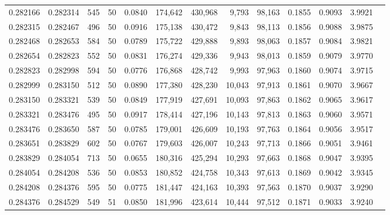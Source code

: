 \begin{tabular}{rrrrrrrrrrrrr}
0.282166 & 0.282314 &   545 &  50 &                                     0.0840 & 174,642 & 430,968 &   9,793 &  98,163 & 0.1855 & 0.9093 & 3.9921 \\
0.282315 & 0.282467 &   496 &  50 &                                     0.0916 & 175,138 & 430,472 &   9,843 &  98,113 & 0.1856 & 0.9088 & 3.9875 \\
0.282468 & 0.282653 &   584 &  50 &                                     0.0789 & 175,722 & 429,888 &   9,893 &  98,063 & 0.1857 & 0.9084 & 3.9821 \\
0.282654 & 0.282823 &   552 &  50 &                                     0.0831 & 176,274 & 429,336 &   9,943 &  98,013 & 0.1859 & 0.9079 & 3.9770 \\
0.282823 & 0.282998 &   594 &  50 &                                     0.0776 & 176,868 & 428,742 &   9,993 &  97,963 & 0.1860 & 0.9074 & 3.9715 \\
0.282999 & 0.283150 &   512 &  50 &                                     0.0890 & 177,380 & 428,230 &  10,043 &  97,913 & 0.1861 & 0.9070 & 3.9667 \\
0.283150 & 0.283321 &   539 &  50 &                                     0.0849 & 177,919 & 427,691 &  10,093 &  97,863 & 0.1862 & 0.9065 & 3.9617 \\
0.283321 & 0.283476 &   495 &  50 &                                     0.0917 & 178,414 & 427,196 &  10,143 &  97,813 & 0.1863 & 0.9060 & 3.9571 \\
0.283476 & 0.283650 &   587 &  50 &                                     0.0785 & 179,001 & 426,609 &  10,193 &  97,763 & 0.1864 & 0.9056 & 3.9517 \\
0.283651 & 0.283829 &   602 &  50 &                                     0.0767 & 179,603 & 426,007 &  10,243 &  97,713 & 0.1866 & 0.9051 & 3.9461 \\
0.283829 & 0.284054 &   713 &  50 &                                     0.0655 & 180,316 & 425,294 &  10,293 &  97,663 & 0.1868 & 0.9047 & 3.9395 \\
0.284054 & 0.284208 &   536 &  50 &                                     0.0853 & 180,852 & 424,758 &  10,343 &  97,613 & 0.1869 & 0.9042 & 3.9345 \\
0.284208 & 0.284376 &   595 &  50 &                                     0.0775 & 181,447 & 424,163 &  10,393 &  97,563 & 0.1870 & 0.9037 & 3.9290 \\
0.284376 & 0.284529 &   549 &  51 &                                     0.0850 & 181,996 & 423,614 &  10,444 &  97,512 & 0.1871 & 0.9033 & 3.9240 \\

\end{tabular}
